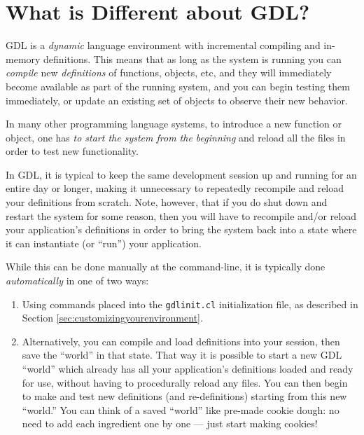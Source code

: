 \documentclass [11pt]{book}
\begin{document}
\section{What is Different about GDL?}

\label{sec:whatisdifferentaboutgdl?}

GDL is a \emph{dynamic} language environment with incremental compiling and in-memory
definitions. This means that as long as the system is running you
can \emph{compile} new \emph{definitions} of functions, objects, etc, and they will immediately become
available as part of the running system, and you can begin testing
them immediately, or update an existing set of objects to observe
their new behavior.

In many other programming language systems, to introduce a new
function or object, one has \emph{to start the system from the beginning} and reload all the files in order to test new functionality.
 
In GDL, it is typical to keep the same development session up and
running for an entire day or longer, making it unnecessary to
repeatedly recompile and reload your definitions from scratch. Note,
however, that if you do shut down and restart the system for some
reason, then you will have to recompile and/or reload your
application's definitions in order to bring the system back into a
state where it can instantiate (or ``run'') your application.

While this can be done manually at the command-line, it is typically
done \emph{automatically} in one of two ways:

\begin{enumerate}

\item Using commands placed into
the \texttt{gdlinit.cl} initialization file, as described in Section 
\ref{sec:customizingyourenvironment}.

\item Alternatively, you can compile and load definitions into
your session, then save the ``world'' in that state. That way it is
possible to start a new GDL ``world'' which already has all your
application's definitions loaded and ready for use, without having to
procedurally reload any files. You can then begin to make and test new
definitions (and re-definitions) starting from this new ``world.''
You can think of a saved ``world'' like pre-made cookie dough: no need
to add each ingredient one by one --- just start making cookies!

\end{enumerate}
\end{document}
